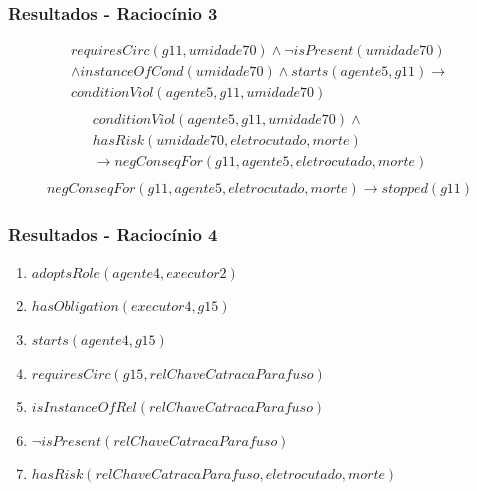 \documentclass{beamer}
\begin{document}
\begin{frame}
	\frametitle{Resultados - Raciocínio 3}
	\begin{eqnarray}\nonumber
		requiresCirc(g11,umidade70) \wedge \neg isPresent(umidade70) \\ \nonumber
		\wedge instanceOfCond(umidade70) \wedge starts(agente5,g11)  \to \\ \nonumber   
		conditionViol(agente5,g11,umidade70) \nonumber \\	
	\end{eqnarray}
	\begin{eqnarray} \nonumber
		conditionViol(agente5,g11,umidade70) \wedge \nonumber \\
		hasRisk(umidade70,eletrocutado,morte) \nonumber \\ 
		\to negConseqFor(g11,agente5,eletrocutado,morte) \nonumber \\ 	
	\end{eqnarray}
	\begin{eqnarray}
		negConseqFor(g11,agente5,eletrocutado,morte) \to stopped(g11)
	\end{eqnarray}

\end{frame}

\begin{frame}
	\frametitle{Resultados - Raciocínio 4}
	\begin{enumerate}
		\item $adoptsRole(agente4,executor2)$
		\item $hasObligation(executor4,g15)$	
		\item $starts(agente4,g15)$ 
		\item $requiresCirc(g15,relChaveCatracaParafuso)$
		\item $isInstanceOfRel(relChaveCatracaParafuso)$	
		\item $\neg isPresent(relChaveCatracaParafuso)$
		\item $hasRisk(relChaveCatracaParafuso,eletrocutado,morte)$
	\end{enumerate}
\end{frame}
\end{document}
